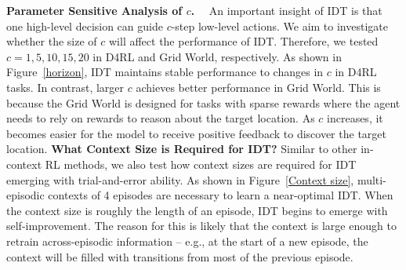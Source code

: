 \documentclass{article}
\theoremstyle{plain}
\theoremstyle{definition}
\theoremstyle{remark}
\begin{document}
\noindent\textbf{Parameter Sensitive Analysis of $c$.}~~
An important insight of IDT is that one high-level decision can guide $c$-step low-level actions. We aim to investigate whether the size of $c$ will affect the performance of IDT. Therefore, we tested $c=1,5,10,15,20$ in D4RL and Grid World, respectively. As shown in Figure~\ref{horizon}, IDT maintains stable performance to changes in $c$ in D4RL tasks. In contrast, larger $c$ achieves better performance in Grid World. This is because the Grid World is designed for tasks with sparse rewards where the agent needs to rely on rewards to reason about the target location. As $c$ increases, it becomes easier for the model to receive positive feedback to discover the target location.
\noindent\textbf{What Context Size is Required for IDT?} Similar to other in-context RL methods, we also test how context sizes are required for IDT emerging with trial-and-error ability. As shown in Figure~\ref{Context size}, multi-episodic contexts of 4 episodes are necessary to learn a near-optimal IDT. When the context size is roughly the length of an episode, IDT begins to emerge with self-improvement. The reason for this is likely that the context is large enough to retrain across-episodic information – e.g., at the start of a new episode, the context will be filled with transitions from most of the previous episode.
\end{document}
